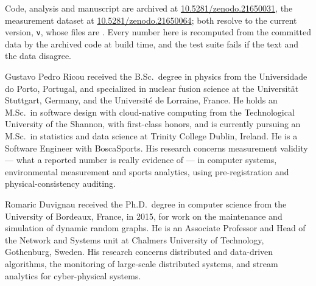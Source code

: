 \documentclass[10pt,journal,compsoc]{IEEEtran}
\begin{document}
Code, analysis and manuscript are archived at
\href{https://doi.org/10.5281/zenodo.21650031}{10.5281/zenodo.21650031}, the measurement
dataset at \href{https://doi.org/10.5281/zenodo.21650064}{10.5281/zenodo.21650064}; both
resolve to the current version, \texttt{v\artifactVersion}, whose files are
\artifactAccessPhrase{}. Every
number here is recomputed from the committed data by the archived code at build
time, and the test suite fails if the text and the data disagree.




\begin{IEEEbiographynophoto}{Gustavo Pedro Ricou}
received the B.Sc.\ degree in physics from the Universidade do Porto, Portugal, and
specialized in nuclear fusion science at the Universit\"at Stuttgart, Germany, and the
Universit\'e de Lorraine, France. He holds an
M.Sc.\ in software design with cloud-native computing from the Technological University of
the Shannon, with first-class honors, and is currently pursuing an M.Sc.\ in statistics and
data science at Trinity College Dublin, Ireland. He is a Software Engineer with
BoscaSports. His research concerns measurement validity --- what a reported number is really
evidence of --- in computer systems, environmental measurement and sports analytics, using
pre-registration and physical-consistency auditing.
\end{IEEEbiographynophoto}

\begin{IEEEbiographynophoto}{Romaric Duvignau}
received the Ph.D.\ degree in computer science from the University of Bordeaux, France, in
2015, for work on the maintenance and simulation of dynamic random graphs. He is an
Associate Professor and Head of the Network and Systems unit at Chalmers
University of Technology, Gothenburg, Sweden. His research concerns distributed and
data-driven algorithms, the monitoring of large-scale distributed systems, and stream
analytics for cyber-physical systems.
\end{IEEEbiographynophoto}
\end{document}
